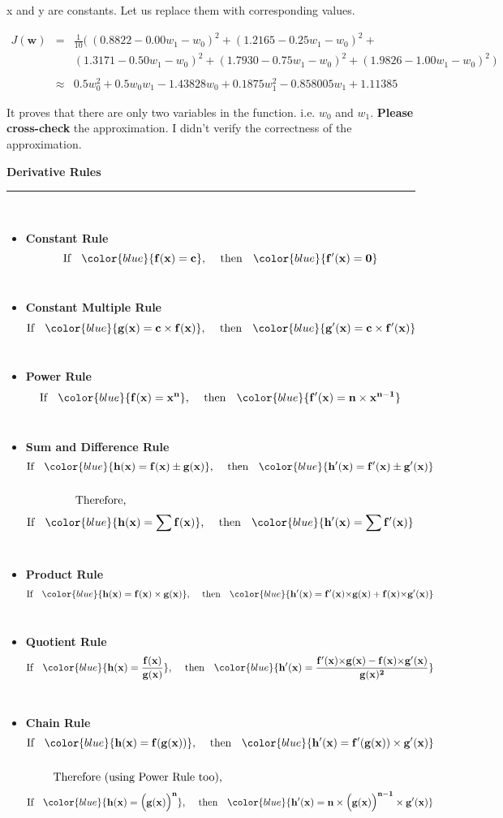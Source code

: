 \documentclass[12pt]{article}
\newcommand{\drule}[2]{\[\text{If \; } {\color{blue} {\large \mathbf{#1}}} \text{, \quad then \; } {\color{blue} {\large \mathbf{#2}}}\]\\}
\begin{document}
\vspace{3mm}

\noindent x and y are constants. Let us replace them with corresponding values.


\begin{eqnarray*}
J(\mathbf{w}) & = & \frac{1}{10} (\ (0.8822 -  0.00 w_1 - w_0)^2 + 
      (1.2165 - 0.25 w_1 - w_0)^2 + \\ 
& &   (1.3171 - 0.50 w_1 - w_0)^2 + 
     (1.7930 - 0.75 w_1 - w_0)^2 + 
      (1.9826 - 1.00 w_1 - w_0)^2\ ) \\
\\
& \approx & 0.5 w_0^2 + 0.5 w_0 w_1 - 1.43828 w_0 + 0.1875 w_1^2 - 0.858005 w_1 + 1.11385 
\end{eqnarray*}

\vspace{2mm}
 
It proves that there are only two variables in the function. i.e. $w_0$ and $w_1$. 
\textbf{Please cross-check} the approximation. I didn't verify the correctness of the approximation. 


\break
{\Large \textbf{Derivative Rules}} \\
\rule{\textwidth}{1pt}
\vspace{1mm} \\
\begin{itemize}
 \item \textbf{Constant Rule}
 	\drule{f(x) = c}{f'(x) = 0} 
 \item \textbf{Constant Multiple Rule}
	\drule{g(x) = c \times f(x)}{g'(x) = c \times f'(x)}
 \item \textbf{Power Rule}
	\drule{f(x) = x^n}{f'(x) = n \times x^{n-1}}
 \item \textbf{Sum and Difference Rule}
	\drule{h(x) = f(x) \pm g(x)}{h'(x) = f'(x) \pm g'(x)}
        $\text{ \qquad  \qquad Therefore,}$
	\drule{h(x) = \sum f(x)}{h'(x) = \sum f'(x) }
 \item \textbf{Product Rule}
	\drule{h(x) = f(x) \times g(x)}{h'(x) = f'(x){\times}g(x) + f(x){\times}g'(x)}
 \item \textbf{Quotient Rule}
	\drule{h(x) = \frac{f(x)}{g(x)}}{h'(x) = \frac{f'(x){\times}g(x) - f(x){\times}g'(x)}{g(x)^2}}
 \item \textbf{Chain Rule} 
	\drule{h(x) = f(g(x))}{h'(x) = f'(g(x)) \times g'(x)}
 	$\text{ \qquad  Therefore (using Power Rule too), }$
	\drule{h(x) = \big(g(x)\big)^n}{h'(x) = n \times \big(g(x)\big)^{n-1} \times g'(x) }
\end{itemize}
\end{document}
